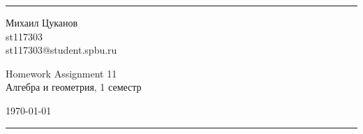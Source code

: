 \documentclass[a4paper, 12pt]{article}
\begin{document}

\fancyhead[C]{}
\hrule \medskip %
\begin{minipage}{0.295\textwidth}
\raggedright\footnotesize
Михаил Цуканов \hfill\\
st117303 \hfill\\
st117303@student.spbu.ru
\end{minipage}
\begin{minipage}{0.4\textwidth}
\centering\large
Homework Assignment 11\\
\normalsize
Алгебра и геометрия, 1 семестр\\
\end{minipage}
\begin{minipage}{0.295\textwidth}
\raggedleft
\today\hfill\\
\end{minipage}
\medskip\hrule
\bigskip

\end{document}
